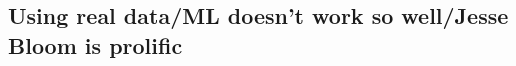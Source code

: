 \documentclass[11pt]{article}
\begin{document}







\subsection*{Using real data/ML doesn't work so well/Jesse Bloom is prolific}
\end{document}
